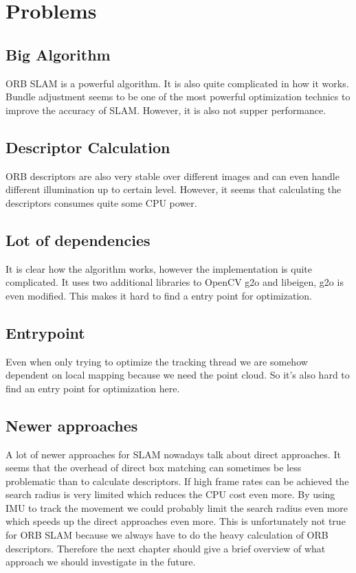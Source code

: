 \documentclass[11pt,a4paper,titlepage,oneside]{report}
\begin{document}
\section{Problems}

\subsection{Big Algorithm}
ORB SLAM is a powerful algorithm. It is also quite complicated in how it works. Bundle adjustment seems to be one of the most powerful optimization technics to improve the accuracy of SLAM. However, it is also not supper performance.

\subsection{Descriptor Calculation}
ORB descriptors are also very stable over different images and can even handle different illumination up to certain level. However, it seems that calculating the descriptors consumes quite some CPU power.

\subsection{Lot of dependencies}
It is clear how the algorithm works, however the implementation is quite complicated. It uses two additional libraries to OpenCV g2o and libeigen, g2o is even modified. This makes it hard to find a entry point for optimization.

\subsection{Entrypoint}
Even when only trying to optimize the tracking thread we are somehow dependent on local mapping because we need the point cloud. So it's also hard to find an entry point for optimization here.\\

\subsection{Newer approaches}
A lot of newer approaches for SLAM nowadays talk about direct approaches. It seems that the overhead of direct box matching can sometimes be less problematic than to calculate descriptors. If high frame rates can be achieved the search radius is very limited which reduces the CPU cost even more. By using IMU to track the movement we could probably limit the search radius even more which speeds up the direct approaches even more. This is unfortunately not true for ORB SLAM because we always have to do the heavy calculation of ORB descriptors. Therefore the next chapter should give a brief overview of what approach we should investigate in the future.
\end{document}
